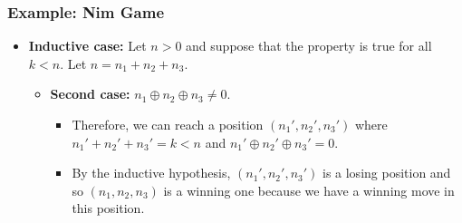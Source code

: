 \documentclass{beamer}
\begin{document}
\begin{frame}%
\frametitle{Example: Nim Game}

\scriptsize

\begin{itemize}

\item \textbf{Inductive case:} Let $n > 0$ and suppose that the property is true for all $k < n$. Let $n = n_1 + n_2 + n_3$.
\begin{itemize}
\scriptsize
\item \textbf{Second case:} $n_1 \oplus n_2 \oplus n_3 \ne 0$.
\vspace{-1cm}
\begin{itemize}
\scriptsize
\item<10-> Therefore, we can reach a position $(n_1', n_2', n_3')$ where $n_1' + n_2' + n_3' = k < n$ and
$n_1' \oplus n_2' \oplus n_3' = 0$.
\vspace{0.2cm}
\item<11> By the inductive hypothesis, $(n_1', n_2', n_3')$ is a losing position and so $(n_1, n_2, n_3)$ is a winning one because
we have a winning move in this position.
\end{itemize}

\end{itemize}

\end{itemize}

\end{frame}
\end{document}
